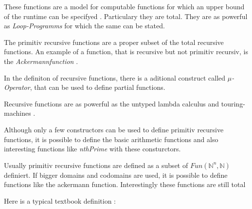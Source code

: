 \documentclass{jfp}
\begin{document}
These functions are a model for computable functions for which an upper bound of the runtime can be specifyed . Particulary they are total.
They are as powerful as  \emph{Loop-Programms}  \cite{loopsRitchie} for which the same can be stated.

The primitiv recursive functions are a proper subset of the  total recursive functions. An example of a function, that is recursive but not primitiv recursiv, is the \emph{Ackermannfunction} \cite{szasz1991machine}.

In the definiton of recursive functions, there is a aditional construct called $\mu$\emph{-Operator}, that can be used to define partial functions.

Recursive functions are as powerful as the untyped lambda calculus and touring-machines \cite{threeModels} \cite[92-94]{ziegler2017godelsche}.

Although  only a few constructors can be used to define primitiv recursive functions, it is possible to define the basic arithmetic functions and also interesting functions like  \emph{nthPrime} with these consturctors.



Usually primitiv recursive functions are defined as a subset of $Fun(\mathbb{N}^n, \mathbb{N})$ definiert. If bigger domains and codomains are used, it is possible to define functions like the ackermann function. Interestingly these functions are still total \cite{DBLP:journals/corr/Widemann16} 


Here is a typical textbook definition\cite{martin2019logik} \cite{wiki:Primitive_recursive_function} :
\end{document}
